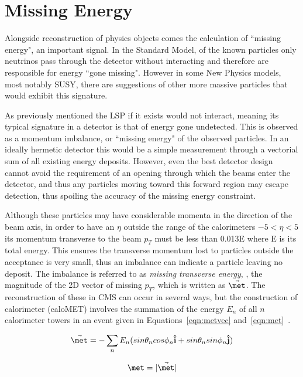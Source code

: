 \section{Missing Energy}

Alongside reconstruction of physics objects comes the calculation of ``missing energy", an important signal. In the Standard Model, of the known particles only neutrinos pass through the detector without interacting and therefore are responsible for energy ``gone missing". However in some New Physics models, most notably SUSY, there are suggestions of other more massive particles that would exhibit this signature. 
 
As previously mentioned the LSP if it exists would not interact, meaning its typical signature in a detector is that of energy gone undetected. This is observed as a momentum imbalance, or ``missing energy" of the observed particles. In an ideally hermetic detector this would be a simple measurement through a vectorial sum of all existing energy deposits. However, even the best detector design cannot avoid the requirement of an opening through which the beams enter the detector, and thus any particles moving toward this forward region may escape detection, thus spoiling the accuracy of the missing energy constraint. 

Although these particles may have considerable momenta in the direction of the beam axis, in order to have an $\eta$ outside the range of the calorimeters $ -5 < \eta < 5$ its momentum transverse to the beam $p_{T}$ must be less than 0.013E where E is its total energy. This ensures the transverse momentum lost to particles outside the acceptance is very small, thus an imbalance can indicate a particle leaving no deposit. The imbalance is referred to as \textit{missing transverse energy}, \met, the magnitude of the 2D vector of missing $p_{T}$, which is written as $\vec{\met}$. The reconstruction of these in CMS can occur in several ways, but the construction of calorimeter \met  (caloMET) involves the summation of the energy $E_{n}$ of all $n$ calorimeter towers in an event given in Equations~\ref{eqn:metvec} and~\ref{eqn:met}~\cite{metrecon}. 

\begin{equation}
\vec{\met} = - \sum_{n} E_{n} (sin \theta_{n} cos \phi_{n} \mathbf{\hat{i}} + sin \theta_{n} sin \phi_{n}  \mathbf{\hat{j}})
\label{eqn:metvec}
\end{equation}

\begin{equation}
\met = | \vec{\met} | 
\label{eqn:met}
\end{equation}

